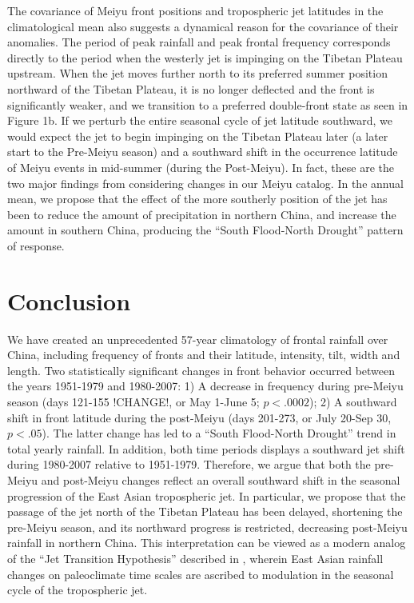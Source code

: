 \documentclass[draft,grl]{AGUTeX}
\begin{document}
\begin{article}
	The covariance of Meiyu front positions and tropospheric jet latitudes in the climatological mean also suggests a dynamical reason for the covariance of their anomalies. The period of peak rainfall and peak frontal frequency corresponds directly to the period when the westerly jet is impinging on the Tibetan Plateau upstream. When the jet moves further north to its preferred summer position northward of the Tibetan Plateau, it is no longer deflected and the front is significantly weaker, and we transition to a preferred double-front state as seen in Figure 1b. If we perturb the entire seasonal cycle of jet latitude southward, we would expect the jet to begin impinging on the Tibetan Plateau later (a later start to the Pre-Meiyu season) and a southward shift in the occurrence latitude of Meiyu events in mid-summer (during the Post-Meiyu). In fact, these are the two major findings from considering changes in our Meiyu catalog. In the annual mean, we propose that the effect of the more southerly position of the jet has been to reduce the amount of precipitation in northern China, and increase the amount in southern China, producing the ``South Flood-North Drought'' pattern of response.
	
\section{Conclusion}

	We have created an unprecedented 57-year climatology of frontal rainfall over China, including frequency of fronts and their latitude, intensity, tilt, width and length. Two statistically significant changes in front behavior occurred between the years 1951-1979 and 1980-2007: 1) A decrease in frequency during pre-Meiyu season (days 121-155 !CHANGE!, or May 1-June 5; $p < .0002$); 2) A southward shift in front latitude during the post-Meiyu (days 201-273, or July 20-Sep 30, $p<.05$). The latter change has led to a ``South Flood-North Drought'' trend in total yearly rainfall. In addition, both time periods displays a southward jet shift during 1980-2007 relative to 1951-1979. Therefore, we argue that both the pre-Meiyu and post-Meiyu changes reflect an overall southward shift in the seasonal progression of the East Asian tropospheric jet. In particular, we propose that the passage of the jet north of the Tibetan Plateau has been delayed, shortening the pre-Meiyu season, and its northward progress is restricted, decreasing post-Meiyu rainfall in northern China. This interpretation can be viewed as a modern analog of the ``Jet Transition Hypothesis'' described in \citet{Chiang2015}, wherein East Asian rainfall changes on paleoclimate time scales are ascribed to modulation in the seasonal cycle of the tropospheric jet. 
	

\end{article}
\end{document}
